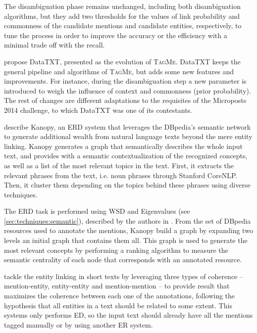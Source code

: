 The disambiguation phase remains unchanged, including both disambiguation algorithms, but they add two thresholds for the values of link probability and commonness of the candidate mentions and candidate entities, respectively, to tune the process in order to improve the accuracy or the efficiency with a minimal trade off with the recall.

\medskip

\cite{scaiella2014} propose DataTXT, presented as the evolution of \textsc{TagMe}. DataTXT keeps the general pipeline and algorithms of \textsc{TagMe}, but adds some new features and improvements. For instance, during the disambiguation step a new parameter is introduced to weigh the influence of context and commonness (prior probability). The rest of changes are different adaptations to the requisites of the Microposts 2014 challenge, to which DataTXT was one of its contestants.

\medskip

\cite{hulpus2013} describe Kanopy, an ERD system that leverages the DBpedia's semantic network to generate additional wealth from natural language texts beyond the mere entity linking. Kanopy generates a graph that semantically describes the whole input text, and provides with a semantic contextualization of the recognized concepts, as well as a list of the most relevant topics in the text. First, it extracts the relevant phrases from the text, i.e. noun phrases through Stanford CoreNLP. Then, it cluster them depending on the topics behind these phrases using diverse techniques.

The ERD task is performed using WSD and Eigenvalues (see \autoref{sec:techniques:semantic}), described by the authors in \cite{hulpus2012}. From the set of DBpedia resources used to annotate the mentions, Kanopy build a graph by expanding two levels an initial graph that contains them all. This graph is used to generate the most relevant concepts by performing a ranking algorithm to measure the semantic centrality of each node that corresponds with an annotated resource.

\medskip

\cite{liu2013} tackle the entity linking in short texts by leveraging three types of coherence -- mention-entity, entity-entity and mention-mention -- to provide result that maximizes the coherence between each one of the annotations, following the hypothesis that all entities in a text should be related to some extent. This systems only performs ED, so the input text should already have all the mentions tagged manually or by using another ER system.

